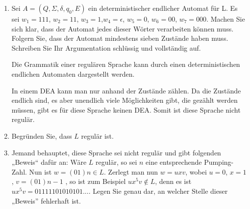 \documentclass{lehramt-informatik-aufgabe}
\begin{document}
\begin{enumerate}


\item Sei $A = (Q, \Sigma, \delta, q_0 , E)$ ein deterministischer
endlicher Automat für L. Es sei $w_1 = 111$, $w_2 = 11$, $w_3 = 1$,$ w_4
= \epsilon$, $w_5 = 0$, $w_6 = 00$, $w_7 = 000$. Machen Sie sich klar,
dass der Automat jedes dieser Wörter verarbeiten können muss. Folgern
Sie, dass der Automat mindestens sieben Zustände haben muss. Schreiben
Sie Ihr Argumentation schlüssig und vollständig auf.

\begin{liAntwort}

Die Grammatik einer regulären Sprache kann durch einen deterministischen
endlichen Automaten dargestellt werden.

In einem DEA kann man nur anhand der Zustände zählen. Da die Zustände
endlich sind, es aber unendlich viele Möglichkeiten gibt, die gezählt
werden müssen, gibt es für diese Sprache keinen DEA. Somit ist diese
Sprache nicht regulär.
\end{liAntwort}


\item Begründen Sie, dass $L$ regulär ist.

\begin{liAntwort}
\begin{center}
\end{center}
\end{liAntwort}


\item Jemand behauptet, diese Sprache sei nicht regulär und gibt
folgenden „Beweis“ dafür an: Wäre $L$ regulär, so sei $n$ eine
entsprechende Pumping-Zahl. Nun ist $w = (01) n \in L$. Zerlegt man nun
$w = uxv$, wobei $u = 0$, $x = 1$, $v = (01) n-1$ , so ist zum Beispiel
$ux^5 v \notin L$, denn es ist $ux^5 v = 01111101010101$.... Legen Sie
genau dar, an welcher Stelle dieser „Beweis” fehlerhaft ist.


\end{enumerate}
\end{document}
